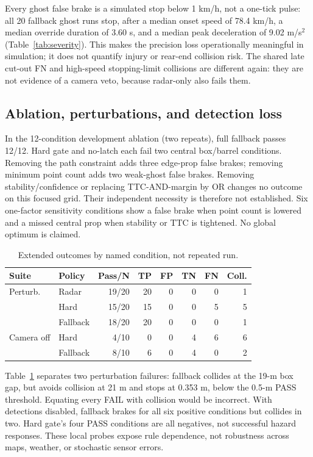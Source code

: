 \documentclass[conference]{IEEEtran}
\begin{document}
Every ghost false brake is a simulated stop below 1 km/h, not a one-tick pulse:
all 20 fallback ghost runs stop, after a median onset speed of 78.4 km/h, a
median override duration of 3.60 s, and a median peak deceleration of
9.02 m/s$^2$ (Table~\ref{tab:severity}).
This makes the precision loss operationally meaningful in simulation; it does
not quantify injury or rear-end collision risk. The shared
late cut-out FN and high-speed stopping-limit collisions are different again:
they are not evidence of a camera veto, because radar-only also fails them.

\subsection{Ablation, perturbations, and detection loss}
In the 12-condition development ablation (two repeats), full fallback passes
12/12. Hard gate and no-latch each fail two central box/barrel conditions.
Removing the path constraint adds three edge-prop false brakes; removing minimum
point count adds two weak-ghost false brakes. Removing stability/confidence or
replacing TTC-AND-margin by OR changes no outcome on this focused grid. Their
independent necessity is therefore not established. Six one-factor sensitivity
conditions show a false brake when point count is lowered and a missed central
prop when stability or TTC is tightened. No global optimum is claimed.

\begin{table}[t]
\caption{Extended outcomes by named condition, not repeated run.}
\label{tab:extended}
\centering\scriptsize
\setlength{\tabcolsep}{3pt}
\begin{tabular}{llrrrrrr}
\toprule Suite & Policy & Pass/N & TP & FP & TN & FN & Coll.\\ \midrule
Perturb. & Radar & 19/20 & 20 & 0 & 0 & 0 & 1\\
 & Hard & 15/20 & 15 & 0 & 0 & 5 & 5\\
 & Fallback & 18/20 & 20 & 0 & 0 & 0 & 1\\
\midrule
Camera off & Hard & 4/10 & 0 & 0 & 4 & 6 & 6\\
 & Fallback & 8/10 & 6 & 0 & 4 & 0 & 2\\
\bottomrule
\end{tabular}
\end{table}

Table~\ref{tab:extended} separates two perturbation failures: fallback collides
at the 19-m box gap, but avoids collision at 21 m and stops at 0.353 m, below
the 0.5-m PASS threshold. Equating every FAIL with collision would be incorrect.
With detections disabled, fallback brakes for all six positive conditions but
collides in two. Hard gate's four PASS conditions are all negatives, not
successful hazard responses. These local probes expose rule dependence, not
robustness across maps, weather, or stochastic sensor errors.
\end{document}

